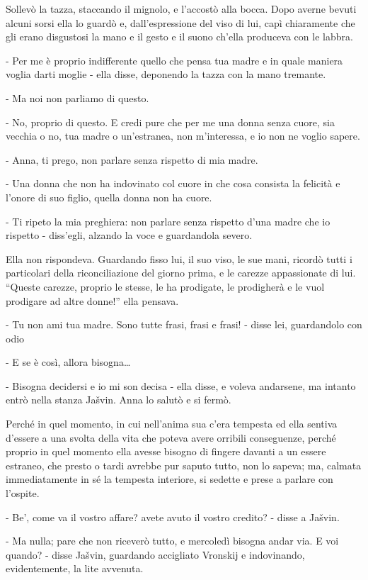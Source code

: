 Sollevò la tazza, staccando il mignolo, e l'accostò alla bocca. Dopo averne bevuti alcuni sorsi ella lo guardò e, dall'espressione del viso di lui, capì chiaramente che gli erano disgustosi la mano e il gesto e il suono ch'ella produceva con le labbra. 

- Per me è proprio indifferente quello che pensa tua madre e in quale maniera voglia darti moglie - ella disse, deponendo la tazza con la mano tremante. 

- Ma noi non parliamo di questo. 

- No, proprio di questo. E credi pure che per me una donna senza cuore, sia vecchia o no, tua madre o un'estranea, non m'interessa, e io non ne voglio sapere. 

- Anna, ti prego, non parlare senza rispetto di mia madre. 

- Una donna che non ha indovinato col cuore in che cosa consista la felicità e l'onore di suo figlio, quella donna non ha cuore. 

- Ti ripeto la mia preghiera: non parlare senza rispetto d'una madre che io rispetto - diss'egli, alzando la voce e guardandola severo. 

Ella non rispondeva. Guardando fisso lui, il suo viso, le sue mani, ricordò tutti i particolari della riconciliazione del giorno prima, e le carezze appassionate di lui. ``Queste carezze, proprio le stesse, le ha prodigate, le prodigherà e le vuol prodigare ad altre donne!'' ella pensava. 

- Tu non ami tua madre. Sono tutte frasi, frasi e frasi! - disse lei, guardandolo con odio 

- E se è così, allora bisogna\ldots{} 

- Bisogna decidersi e io mi son decisa - ella disse, e voleva andarsene, ma intanto entrò nella stanza Jašvin. Anna lo salutò e si fermò. 

Perché in quel momento, in cui nell'anima sua c'era tempesta ed ella sentiva d'essere a una svolta della vita che poteva avere orribili conseguenze, perché proprio in quel momento ella avesse bisogno di fingere davanti a un essere estraneo, che presto o tardi avrebbe pur saputo tutto, non lo sapeva; ma, calmata immediatamente in sé la tempesta interiore, si sedette e prese a parlare con l'ospite. 

- Be', come va il vostro affare? avete avuto il vostro credito? - disse a Jašvin. 

- Ma nulla; pare che non riceverò tutto, e mercoledì bisogna andar via. E voi quando? - disse Jašvin, guardando accigliato Vronskij e indovinando, evidentemente, la lite avvenuta. 

